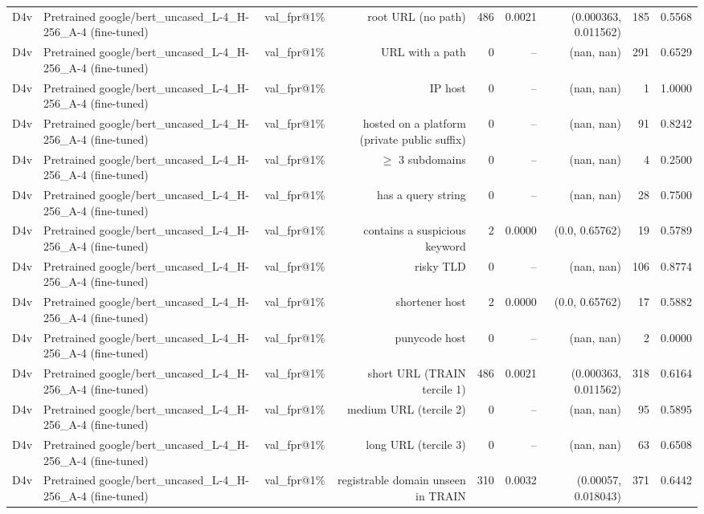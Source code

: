 \begin{table}[t]
\begin{tabular}{llrrrrrrr}
D4v & Pretrained google/bert\_uncased\_L-4\_H-256\_A-4 (fine-tuned) & val\_fpr@1\% & root URL (no path) & 486 & 0.0021 & (0.000363, 0.011562) & 185 & 0.5568 \\
D4v & Pretrained google/bert\_uncased\_L-4\_H-256\_A-4 (fine-tuned) & val\_fpr@1\% & URL with a path & 0 & -- & (nan, nan) & 291 & 0.6529 \\
D4v & Pretrained google/bert\_uncased\_L-4\_H-256\_A-4 (fine-tuned) & val\_fpr@1\% & IP host & 0 & -- & (nan, nan) & 1 & 1.0000 \\
D4v & Pretrained google/bert\_uncased\_L-4\_H-256\_A-4 (fine-tuned) & val\_fpr@1\% & hosted on a platform (private public suffix) & 0 & -- & (nan, nan) & 91 & 0.8242 \\
D4v & Pretrained google/bert\_uncased\_L-4\_H-256\_A-4 (fine-tuned) & val\_fpr@1\% & $\geq$ 3 subdomains & 0 & -- & (nan, nan) & 4 & 0.2500 \\
D4v & Pretrained google/bert\_uncased\_L-4\_H-256\_A-4 (fine-tuned) & val\_fpr@1\% & has a query string & 0 & -- & (nan, nan) & 28 & 0.7500 \\
D4v & Pretrained google/bert\_uncased\_L-4\_H-256\_A-4 (fine-tuned) & val\_fpr@1\% & contains a suspicious keyword & 2 & 0.0000 & (0.0, 0.65762) & 19 & 0.5789 \\
D4v & Pretrained google/bert\_uncased\_L-4\_H-256\_A-4 (fine-tuned) & val\_fpr@1\% & risky TLD & 0 & -- & (nan, nan) & 106 & 0.8774 \\
D4v & Pretrained google/bert\_uncased\_L-4\_H-256\_A-4 (fine-tuned) & val\_fpr@1\% & shortener host & 2 & 0.0000 & (0.0, 0.65762) & 17 & 0.5882 \\
D4v & Pretrained google/bert\_uncased\_L-4\_H-256\_A-4 (fine-tuned) & val\_fpr@1\% & punycode host & 0 & -- & (nan, nan) & 2 & 0.0000 \\
D4v & Pretrained google/bert\_uncased\_L-4\_H-256\_A-4 (fine-tuned) & val\_fpr@1\% & short URL (TRAIN tercile 1) & 486 & 0.0021 & (0.000363, 0.011562) & 318 & 0.6164 \\
D4v & Pretrained google/bert\_uncased\_L-4\_H-256\_A-4 (fine-tuned) & val\_fpr@1\% & medium URL (tercile 2) & 0 & -- & (nan, nan) & 95 & 0.5895 \\
D4v & Pretrained google/bert\_uncased\_L-4\_H-256\_A-4 (fine-tuned) & val\_fpr@1\% & long URL (tercile 3) & 0 & -- & (nan, nan) & 63 & 0.6508 \\
D4v & Pretrained google/bert\_uncased\_L-4\_H-256\_A-4 (fine-tuned) & val\_fpr@1\% & registrable domain unseen in TRAIN & 310 & 0.0032 & (0.00057, 0.018043) & 371 & 0.6442 \\

\end{tabular}
\end{table}
